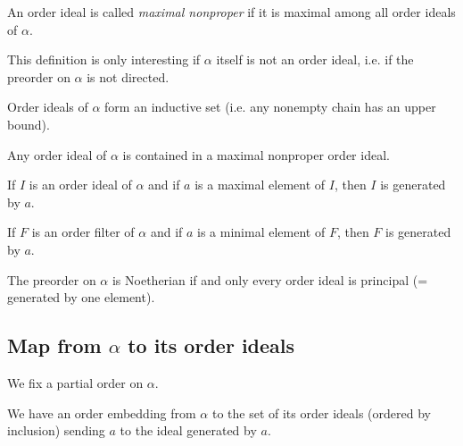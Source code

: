 \begin{subdefi}
An order ideal is called \emph{maximal nonproper} if it is maximal among all order ideals of $\alpha$.

\end{subdefi}

This definition is only interesting if $\alpha$ itself is not an order ideal, i.e. if the preorder on $\alpha$ is not directed.

\begin{sublemma}
Order ideals of $\alpha$ form an inductive set (i.e. any nonempty chain has an upper bound).

\end{sublemma}

\begin{sublemma}
Any order ideal of $\alpha$ is contained in a maximal nonproper order ideal.

\end{sublemma}

\begin{sublemma}
If $I$ is an order ideal of $\alpha$ and if $a$ is a maximal element of $I$, then $I$ is generated by $a$.

\end{sublemma}

\begin{sublemma}
If $F$ is an order filter of $\alpha$ and if $a$ is a minimal element of $F$, then $F$ is generated by $a$.

\end{sublemma}

\begin{sublemma}
The preorder on $\alpha$ is Noetherian if and only every order ideal is principal (= generated by one element).

\end{sublemma}


\subsection{Map from $\alpha$ to its order ideals}

We fix a partial order on $\alpha$.

\begin{subdefi}
We have an order embedding from $\alpha$ to the set of its order ideals (ordered by inclusion) sending $a$ to the
ideal generated by $a$.

\end{subdefi}

